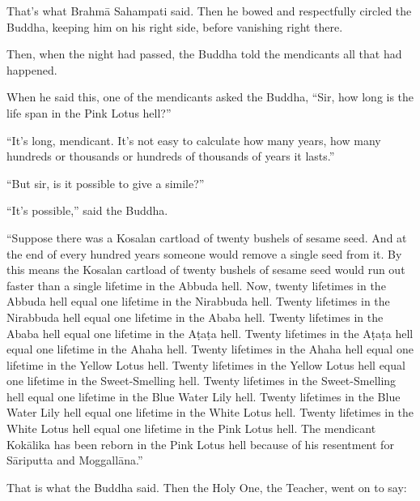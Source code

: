 \documentclass[12pt,openany]{book}%
\begin{document}
That’s what \textsanskrit{Brahmā} Sahampati said. Then he bowed and respectfully circled the Buddha, keeping him on his right side, before vanishing right there. 

Then, when the night had passed, the Buddha told the mendicants all that had happened. 

When he said this, one of the mendicants asked the Buddha, “Sir, how long is the life span in the Pink Lotus hell?” 

“It’s long, mendicant. It’s not easy to calculate how many years, how many hundreds or thousands or hundreds of thousands of years it lasts.” 

“But sir, is it possible to give a simile?” 

“It’s possible,” said the Buddha. 

“Suppose there was a Kosalan cartload of twenty bushels of sesame seed. And at the end of every hundred years someone would remove a single seed from it. By this means the Kosalan cartload of twenty bushels of sesame seed would run out faster than a single lifetime in the Abbuda hell. Now, twenty lifetimes in the Abbuda hell equal one lifetime in the Nirabbuda hell. Twenty lifetimes in the Nirabbuda hell equal one lifetime in the Ababa hell. Twenty lifetimes in the Ababa hell equal one lifetime in the \textsanskrit{Aṭaṭa} hell. Twenty lifetimes in the \textsanskrit{Aṭaṭa} hell equal one lifetime in the Ahaha hell. Twenty lifetimes in the Ahaha hell equal one lifetime in the Yellow Lotus hell. Twenty lifetimes in the Yellow Lotus hell equal one lifetime in the Sweet-Smelling hell. Twenty lifetimes in the Sweet-Smelling hell equal one lifetime in the Blue Water Lily hell. Twenty lifetimes in the Blue Water Lily hell equal one lifetime in the White Lotus hell. Twenty lifetimes in the White Lotus hell equal one lifetime in the Pink Lotus hell. The mendicant \textsanskrit{Kokālika} has been reborn in the Pink Lotus hell because of his resentment for \textsanskrit{Sāriputta} and \textsanskrit{Moggallāna}.” 

That is what the Buddha said. Then the Holy One, the Teacher, went on to say: 
\end{document}
